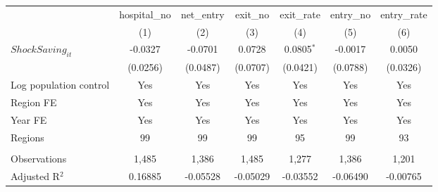 \begingroup
\centering
\begin{tabular}{lcccccc}
   \toprule
                          & hospital\_no  & net\_entry  & exit\_no  & exit\_rate   & entry\_no  & entry\_rate \\    
                          & (1)           & (2)         & (3)       & (4)          & (5)        & (6)\\  
   \midrule 
   $ShockSaving_{it}$     & -0.0327       & -0.0701     & 0.0728    & 0.0805$^{*}$ & -0.0017    & 0.0050\\   
                          & (0.0256)      & (0.0487)    & (0.0707)  & (0.0421)     & (0.0788)   & (0.0326)\\   
   Log population control & Yes           & Yes         & Yes       & Yes          & Yes        & Yes\\  
   Region FE              & Yes           & Yes         & Yes       & Yes          & Yes        & Yes\\  
   Year FE                & Yes           & Yes         & Yes       & Yes          & Yes        & Yes\\  
   Regions                & 99            & 99          & 99        & 95           & 99         & 93\\  
    \\
   Observations           & 1,485         & 1,386       & 1,485     & 1,277        & 1,386      & 1,201\\  
   Adjusted R$^2$         & 0.16885       & -0.05528    & -0.05029  & -0.03552     & -0.06490   & -0.00765\\  
   \bottomrule
\end{tabular}
\par\endgroup
